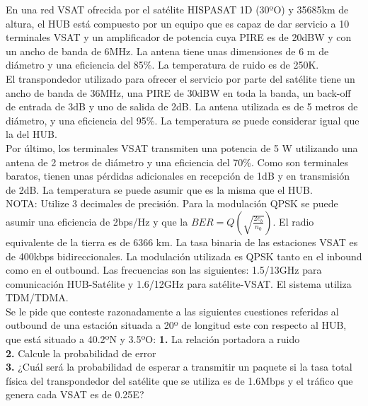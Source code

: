 \begin{exercise}[5]
	En una red VSAT ofrecida por el satélite HISPASAT 1D (30ºO) y 35685km de altura, el HUB está compuesto por un equipo que es capaz de dar servicio a 10 terminales VSAT y un amplificador de potencia cuya PIRE es de 20dBW y con un ancho de banda de 6MHz. La antena tiene unas dimensiones de 6 m de diámetro y una eficiencia del 85\%. La temperatura de ruido es de 250K.\\
	El transpondedor utilizado para ofrecer el servicio por parte del satélite tiene un ancho de banda de 36MHz, una PIRE de 30dBW en toda la banda, un back-off de entrada de 3dB y uno de salida de 2dB. La antena utilizada es de 5 metros de diámetro, y una eficiencia del 95\%. La temperatura se puede considerar igual que la del HUB.\\
	Por último, los terminales VSAT transmiten una potencia de 5 W utilizando una antena de 2 metros de diámetro y una eficiencia del 70\%. Como son terminales baratos, tienen unas pérdidas adicionales en recepción de 1dB y en transmisión de 2dB. La temperatura se puede asumir que es la misma que el HUB.\\
	NOTA: Utilize 3 decimales de precisión. Para la modulación QPSK se puede asumir una eficiencia de 2bps/Hz y que la $BER=Q(\sqrt{\frac{2e_b}{n_0}})$. El radio equivalente de la tierra es de 6366 km.
	La tasa binaria de las estaciones VSAT es de 400kbps bidireccionales. La modulación utilizada es QPSK tanto en el inbound como en el outbound. Las frecuencias son las siguientes: 1.5/13GHz para comunicación HUB-Satélite y 1.6/12GHz para satélite-VSAT. El sistema utiliza TDM/TDMA.\\
	Se le pide que conteste razonadamente a las siguientes cuestiones referidas al outbound de una estación situada a 20º de longitud este con respecto al HUB, que está situado a 40.2ºN y 3.5ºO: 
	\textbf{1.} La relación portadora a ruido\\
	\textbf{2.} Calcule la probabilidad de error\\
	\textbf{3.} ¿Cuál será la probabilidad de esperar a transmitir un paquete si la tasa total física del transpondedor del satélite que se utiliza es de 1.6Mbps y el tráfico que genera cada VSAT es de 0.25E? 
\end{exercise}
